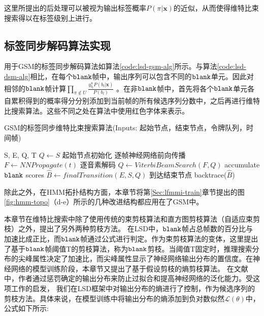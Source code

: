 这里所提出的后处理可以被视为输出标签概率$P(\pi|\mathbf{x})$的近似，从而使得维特比束搜索得以在标签级别上进行。


\subsection{标签同步解码算法实现}
\label{chap:lsd-lsd-hmm-alg}

用于GSM的标签同步解码算法如算法\ref{code:lsd-gsm-alg}所示。与算法\ref{code:lsd-dsm-alg}相比，在每个$\tt blank$帧中，输出序列可以包含不同的$\tt blank$单元。因此对相邻的$\tt blank$帧计算$\prod_{\pi\not\in U}\frac{y_{b_l}^u P(b_l|\mathbf{x})}{P(b_l)}$ 。在非$\tt blank$帧中，首先将各个$\tt blank$单元各自累积得到的概率得分分别添加到当前帧的所有候选序列分数中，之后再进行维特比搜索算法。这些不同之处在算法中使用红色字体来表示。


\begin{algorithm}[ht]
\caption{GSM的标签同步维特比束搜索算法\textcolor[rgb]{0,0.5,0}{(Inputs: 起始节点，结束节点，令牌队列，时间帧)}}
\label{code:lsd-gsm-alg}
\begin{algorithmic}[1]
 {S, E, Q, T}
\State $Q \leftarrow S$ \Comment \textcolor[rgb]{0,0.5,0}{起始节点初始化}
    \Comment \textcolor[rgb]{0,0.5,0}{逐帧神经网络前向传播}
\State $F \leftarrow NNPropagate(t)$
    \Comment \textcolor[rgb]{0,0.5,0}{逐音素解码}
\State  {\color{red}{$F \leftarrow addAccumulatedBlankScore(V,F)$ }}
\State  {\color{red}{$reset(V)$ }}
\State  $Q\leftarrow ViterbiBeamSearch(F, Q)$
\Else         \Comment \textcolor[rgb]{0,0.5,0}{accumulate $\tt blank$ scores}
\State  {\color{red}{$V \leftarrow accumulateBlankScore(V,F)$ }}
\EndIf
\EndFor
\State $\hat B\leftarrow finalTransition(E,S,Q)$ \Comment \textcolor[rgb]{0,0.5,0}{到达结束节点}
\State backtrace($\hat B$)
\EndProcedure
\end{algorithmic}
\end{algorithm}


除此之外，在HMM拓扑结构方面，本章节将第\ref{Sec:lfmmi-train}章节提出的图\ref{fig:hmm-topo}（d-e）所示的几种改进结构都应用在了GSM中。

本章节在维特比搜索中除了使用传统的束剪枝算法\cite{forney1973viterbi}和直方图剪枝算法\cite{steinbiss1994improvements}（自适应束剪枝\cite{van1996adaptive}）之外，提出了另外两种剪枝方法。 在LSD中，$\tt blank$帧占总帧数的百分比与加速比成正比，而$\tt blank$帧通过公式进行判定。作为束剪枝算法的变体，这里提出了基于$\tt blank$帧阈值T的剪枝算法，称为$\tt blank$剪枝。当阈值T固定时，推理搜索分布的尖峰属性决定了加速比，而尖峰属性显示了神经网络输出分布的置信度。在神经网络的模型训练阶段，本章节又提出了基于假设剪枝的熵剪枝算法。 在文献\cite{pereyra2017regularizing}中，作者通过惩罚确定的输出分布来防止过拟合和提高神经网络的泛化能力。受这项工作的启发， 我们在LSD框架中对输出分布的熵进行了控制，作为候选序列的剪枝方法。具体来说，在模型训练中将输出分布的熵添加到负对数似然$\mathcal{L}(\theta)$中，公式如下所示:
  
